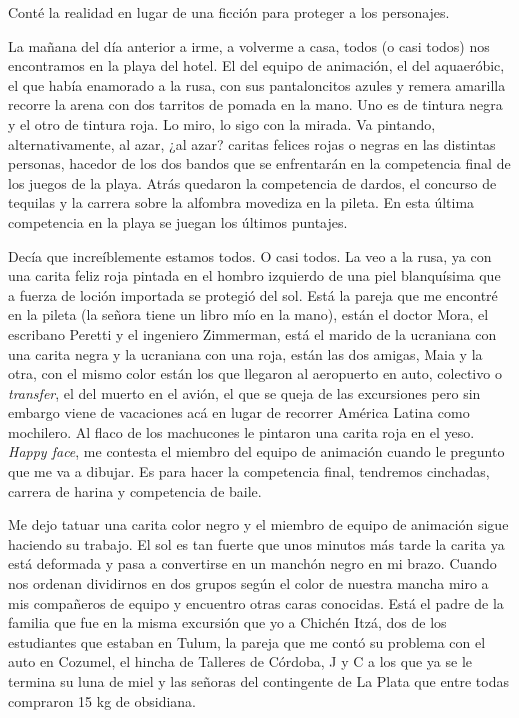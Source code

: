\documentclass[12pt,twoside,openright,a5paper]{book}
\begin{document}
\hrulefill\hspace{0.2cm} \decofourleft\decofourright \hspace{0.2cm} \hrulefill
\vspace{0.5cm}

Conté la realidad en lugar de una ficción para proteger a los personajes.

\vspace{0.5cm}

\hrulefill\hspace{0.2cm} \decofourleft\decofourright \hspace{0.2cm} \hrulefill
\vspace{0.5cm}

La mañana del día anterior a irme, a volverme a casa, todos (o casi todos)
nos encontramos en la playa del hotel. El del equipo de animación, el
del aquaeróbic, el que había enamorado a la rusa, con sus pantaloncitos
azules y remera amarilla recorre la arena con dos tarritos de pomada en la
mano. Uno es de tintura negra y el otro de tintura roja. Lo miro, lo sigo
con la mirada. Va pintando, alternativamente, al azar, ¿al azar? caritas
felices rojas o negras en las distintas personas, hacedor de los dos bandos
que se enfrentarán en la competencia final de los juegos de la playa. Atrás
quedaron la competencia de dardos, el concurso de tequilas y la carrera
sobre la alfombra movediza en la pileta. En esta última competencia en la
playa se juegan los últimos puntajes.

Decía que increíblemente estamos todos. O casi todos. La veo a la rusa,
ya con una carita feliz roja pintada en el hombro izquierdo de una piel
blanquísima que a fuerza de loción importada se protegió del sol. Está
la pareja que me encontré en la pileta (la señora tiene un libro mío
en la mano), están el doctor Mora, el escribano Peretti y el ingeniero
Zimmerman, está el marido de la ucraniana con una carita negra y la
ucraniana con una roja, están las dos amigas, Maia y la otra, con el mismo
color están los que llegaron al aeropuerto en auto, colectivo o \emph{transfer},
el del muerto en el avión, el que se queja de las excursiones pero sin
embargo viene de vacaciones acá en lugar de recorrer América Latina como
mochilero. Al flaco de los machucones le pintaron una carita roja en el
yeso. \emph{Happy face}, me contesta el miembro del equipo de animación cuando
le pregunto que me va a dibujar. Es para hacer la competencia final,
tendremos cinchadas, carrera de harina y competencia de baile.

Me dejo tatuar una carita color negro y el miembro de equipo de animación
sigue haciendo su trabajo. El sol es tan fuerte que unos minutos más tarde
la carita ya está deformada y pasa a convertirse en un manchón negro en mi
brazo. Cuando nos ordenan dividirnos en dos grupos según el color de nuestra
mancha miro a mis compañeros de equipo y encuentro otras caras
conocidas. Está el padre de la familia que fue en la misma excursión que
yo a Chichén Itzá, dos de los estudiantes que estaban en Tulum, la pareja
que me contó su problema con el auto en Cozumel, el hincha de Talleres
de Córdoba, J y C a los que ya se le termina su luna de miel y las señoras
del contingente de La Plata que entre todas compraron 15 kg de obsidiana.
\end{document}
